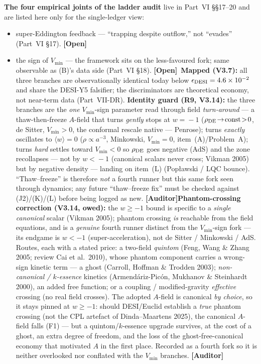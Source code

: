 \documentclass[11pt]{article}
\newcommand{\Auditor}{\textbf{\textcolor{teal!55!black}{[Auditor]}}}
\newcommand{\open}{\textcolor{red!70!black}{\textbf{[Open]}}}
\begin{document}
\textbf{The four empirical joints of the ladder audit} live in Part~VI \S\S17--20 and are listed here only for the single-ledger view:
\begin{itemize}[leftmargin=2.9em,itemsep=2pt]
\item[\textbf{(J1)}] super-Eddington feedback --- ``trapping despite outflow,'' not ``evades'' (Part~VI \S17). \open
\item[\textbf{(J2)}] the sign of $V_{\min}$ --- the framework sits on the less-favoured fork; same observable as (B)'s data side (Part~VI \S18). \open\ \textbf{Mapped (V3.7):} all three branches are observationally identical today below $\epsilon_{\rm DESI}=4.6\times10^{-2}$ and share the DESI-Y5 falsifier; the discriminators are theoretical economy, not near-term data (Part~VII-DR). \textbf{Identity guard (R9, V3.14):} the three branches are the \emph{one} $V_{\min}$-sign parameter read through field \emph{turn-around} --- a thaw-then-freeze $A$-field that turns \emph{gently} stops at $w\!=\!-1$ ($\rho_{\rm DE}\!\to\!{\rm const}\!>\!0$, de Sitter, $V_{\min}\!>\!0$, the conformal rescale native --- Penrose); turns \emph{exactly} oscillates to $\langle w\rangle\!=\!0$ ($\rho\!\propto\!a^{-3}$, Minkowski, $V_{\min}\!=\!0$, item~(A)/Problem~A); turns \emph{hard} settles toward $V_{\min}\!<\!0$ so $\rho_{\rm DE}$ goes negative (AdS) and the zone recollapses --- not by $w\!<\!-1$ (canonical scalars never cross; Vikman 2005) but by negative density --- landing on item~(L) (Pop\l awski / LQC bounce). ``Thaw--freeze'' is therefore \emph{not} a fourth runner but this same fork seen through dynamics; any future ``thaw--freeze fix'' must be checked against (J2)/(K)/(L) before being logged as new. \Auditor \textbf{Phantom-crossing correction (V3.14, owed):} the $w\ge-1$ bound is specific to a \emph{single canonical} scalar (Vikman 2005); phantom crossing \emph{is} reachable from the field equations, and is a \emph{genuine} fourth runner distinct from the $V_{\min}$-sign fork --- its endgame is $w<-1$ (super-acceleration), not de Sitter / Minkowski / AdS. Routes, each with a stated price: a two-field \emph{quintom} (Feng, Wang \& Zhang 2005; review Cai et al.\ 2010), whose phantom component carries a wrong-sign kinetic term --- a ghost (Carroll, Hoffman \& Trodden 2003); \emph{non-canonical / $k$-essence} kinetics (Armend\'ariz-Pic\'on, Mukhanov \& Steinhardt 2000), an added free function; or a coupling / modified-gravity \emph{effective} crossing (no real field crosses). The adopted $A$-field is canonical \emph{by choice}, so it stays pinned at $w\ge-1$: should DESI/Euclid establish a \emph{true} phantom crossing (not the CPL artefact of Dinda--Maartens 2025), the canonical $A$-field falls (F1) --- but a quintom/$k$-essence upgrade survives, at the cost of a ghost, an extra degree of freedom, and the loss of the ghost-free-canonical economy that motivated $A$ in the first place. Recorded as a fourth fork so it is neither overlooked nor conflated with the $V_{\min}$ branches. \Auditor

\end{itemize}
\end{document}
